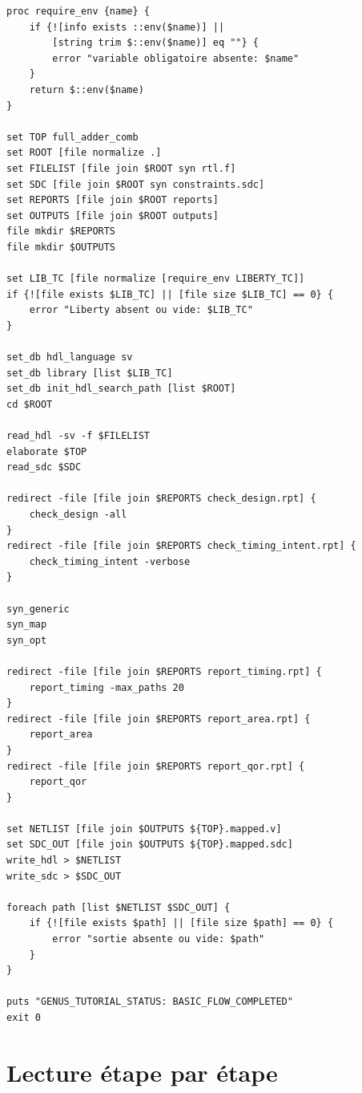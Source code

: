 \documentclass[11pt,a4paper,openany]{report}
\begin{document}
\begin{lstlisting}[style=guidecode,language=TclGuide,
caption={genus\_minimal.tcl}]
proc require_env {name} {
    if {![info exists ::env($name)] ||
        [string trim $::env($name)] eq ""} {
        error "variable obligatoire absente: $name"
    }
    return $::env($name)
}

set TOP full_adder_comb
set ROOT [file normalize .]
set FILELIST [file join $ROOT syn rtl.f]
set SDC [file join $ROOT syn constraints.sdc]
set REPORTS [file join $ROOT reports]
set OUTPUTS [file join $ROOT outputs]
file mkdir $REPORTS
file mkdir $OUTPUTS

set LIB_TC [file normalize [require_env LIBERTY_TC]]
if {![file exists $LIB_TC] || [file size $LIB_TC] == 0} {
    error "Liberty absent ou vide: $LIB_TC"
}

set_db hdl_language sv
set_db library [list $LIB_TC]
set_db init_hdl_search_path [list $ROOT]
cd $ROOT

read_hdl -sv -f $FILELIST
elaborate $TOP
read_sdc $SDC

redirect -file [file join $REPORTS check_design.rpt] {
    check_design -all
}
redirect -file [file join $REPORTS check_timing_intent.rpt] {
    check_timing_intent -verbose
}

syn_generic
syn_map
syn_opt

redirect -file [file join $REPORTS report_timing.rpt] {
    report_timing -max_paths 20
}
redirect -file [file join $REPORTS report_area.rpt] {
    report_area
}
redirect -file [file join $REPORTS report_qor.rpt] {
    report_qor
}

set NETLIST [file join $OUTPUTS ${TOP}.mapped.v]
set SDC_OUT [file join $OUTPUTS ${TOP}.mapped.sdc]
write_hdl > $NETLIST
write_sdc > $SDC_OUT

foreach path [list $NETLIST $SDC_OUT] {
    if {![file exists $path] || [file size $path] == 0} {
        error "sortie absente ou vide: $path"
    }
}

puts "GENUS_TUTORIAL_STATUS: BASIC_FLOW_COMPLETED"
exit 0
\end{lstlisting}

\section{Lecture étape par étape}
\end{document}
